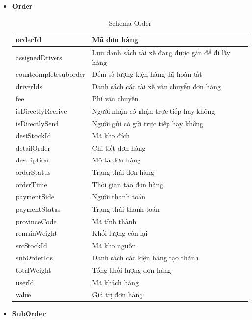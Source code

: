 	\begin{itemize}
		\item \textbf{Order}
		
		\begin{table}[H]
			\centering\begin{tabular}{|l|m{30em}|}
				\hline 
				orderId & Mã đơn hàng\\
				\hline 
				assignedDrivers & Lưu danh sách tài xế đang được gán để đi lấy hàng \\ 
				\hline
				countcompletesuborder & Đếm số lượng kiện hàng đã hoàn tất \\
				\hline 
				driverIds & Danh sách các tài xế vận chuyển đơn hàng \\
				\hline
				fee & Phí vận chuyển \\
				\hline
				isDirectlyReceive & Người nhận có nhận trực tiếp hay không \\
				\hline
				isDirectlySend & Người gửi có gửi trực tiếp hay không \\
				\hline
				destStockId & Mã kho đích \\
				\hline
				detailOrder & Chi tiết đơn hàng \\
				\hline
				description & Mô tả đơn hàng \\
				\hline
				orderStatus & Trạng thái đơn hàng \\
				\hline
				orderTime & Thời gian tạo đơn hàng \\
				\hline
				paymentSide & Người thanh toán \\
				\hline
				paymentStatus & Trạng thái thanh toán \\
				\hline
				provinceCode & Mã tỉnh thành \\
				\hline
				remainWeight & Khối lượng còn lại \\
				\hline
				srcStockId & Mã kho nguồn \\
				\hline
				subOrderIds & Danh sách các kiện hàng tạo thành \\
				\hline
				totalWeight & Tổng khối lượng đơn hàng \\
				\hline
				userId & Mã khách hàng \\
				\hline
				value & Giá trị đơn hàng \\
				\hline
			\end{tabular}
			\caption{Schema Order}
		\end{table}
	
	\newpage
	
		\item \textbf{SubOrder}
		

\end{itemize}
